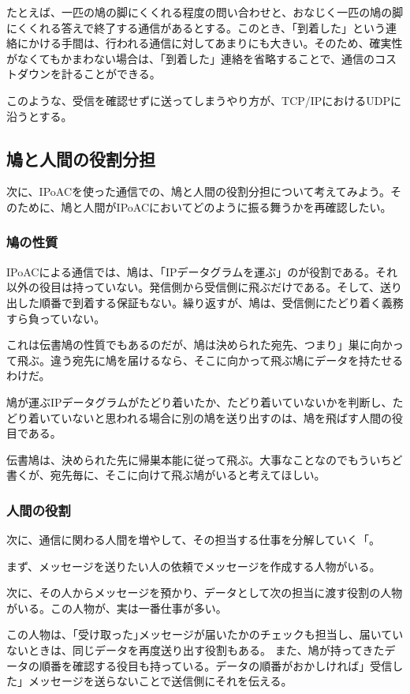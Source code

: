 たとえば、一匹の鳩の脚にくくれる程度の問い合わせと、おなじく一匹の鳩の脚にくくれる答えで終了する通信があるとする。このとき、「到着した」という連絡にかける手間は、行われる通信に対してあまりにも大きい。そのため、確実性がなくてもかまわない場合は、「到着した」連絡を省略することで、通信のコストダウンを計ることができる。

このような、受信を確認せずに送ってしまうやり方が、TCP/IPにおけるUDPに沿うとする。

\subsection{鳩と人間の役割分担}
次に、IPoACを使った通信での、鳩と人間の役割分担について考えてみよう。そのために、鳩と人間がIPoACにおいてどのように振る舞うかを再確認したい。

\subsubsection{鳩の性質}
IPoACによる通信では、鳩は、「IPデータグラムを運ぶ」のが役割である。それ以外の役目は持っていない。発信側から受信側に飛ぶだけである。そして、送り出した順番で到着する保証もない。繰り返すが、鳩は、受信側にたどり着く義務すら負っていない。

これは伝書鳩の性質でもあるのだが、鳩は決められた宛先、つまり」巣に向かって飛ぶ。違う宛先に鳩を届けるなら、そこに向かって飛ぶ鳩にデータを持たせるわけだ。

鳩が運ぶIPデータグラムがたどり着いたか、たどり着いていないかを判断し、たどり着いていないと思われる場合に別の鳩を送り出すのは、鳩を飛ばす人間の役目である。

伝書鳩は、決められた先に帰巣本能に従って飛ぶ。大事なことなのでもういちど書くが、宛先毎に、そこに向けて飛ぶ鳩がいると考えてほしい。

\subsubsection{人間の役割}			

次に、通信に関わる人間を増やして、その担当する仕事を分解していく「。

まず、メッセージを送りたい人の依頼でメッセージを作成する人物がいる。

次に、その人からメッセージを預かり、データとして次の担当に渡す役割の人物がいる。この人物が、実は一番仕事が多い。

この人物は、｢受け取った｣メッセージが届いたかのチェックも担当し、届いていないときは、同じデータを再度送り出す役割もある。
また、鳩が持ってきたデータの順番を確認する役目も持っている。データの順番がおかしければ」受信した」メッセージを送らないことで送信側にそれを伝える。

